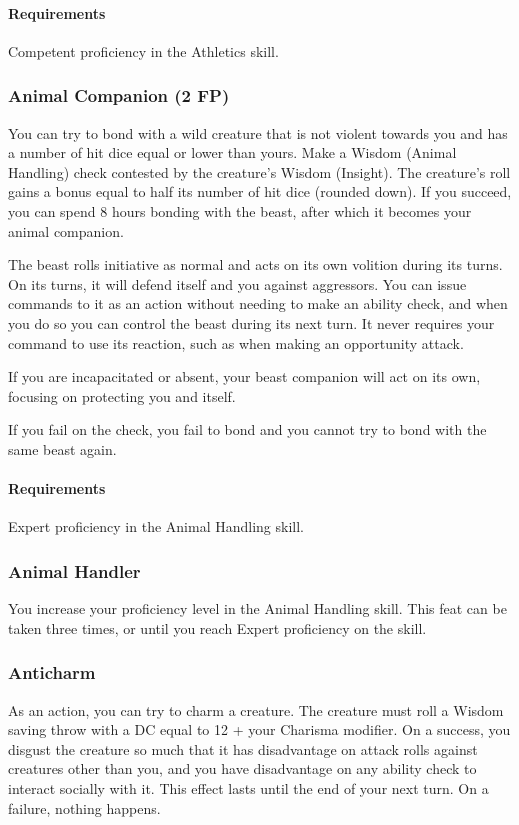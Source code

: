     \paragraph{Requirements} Competent proficiency in the Athletics skill.
\subsubsection{Animal Companion (2 FP)} \label{feat::animalcompanion}
    You can try to bond with a wild creature that is not violent towards you and has a number of hit dice equal or lower than yours.
    Make a Wisdom (Animal Handling) check contested by the creature's Wisdom (Insight).
    The creature's roll gains a bonus equal to half its number of hit dice (rounded down).
    If you succeed, you can spend 8 hours bonding with the beast, after which it becomes your animal companion.

    The beast rolls initiative as normal and acts on its own volition during its turns.
    On its turns, it will defend itself and you against aggressors.
    You can issue commands to it as an action without needing to make an ability check, and when you do so you can control the beast during its next turn.
    It never requires your command to use its reaction, such as when making an opportunity attack.

    If you are incapacitated or absent, your beast companion will act on its own, focusing on protecting you and itself.

    If you fail on the check, you fail to bond and you cannot try to bond with the same beast again.
    \paragraph{Requirements} Expert proficiency in the Animal Handling skill.
\subsubsection{Animal Handler} \label{feat::animalhandler}
    You increase your proficiency level in the Animal Handling skill.
    This feat can be taken three times, or until you reach Expert proficiency on the skill.
\subsubsection{Anticharm} \label{feat::anticharm}
    As an action, you can try to charm a creature.
    The creature must roll a Wisdom saving throw with a DC equal to 12 + your Charisma modifier.
    On a success, you disgust the creature so much that it has disadvantage on attack rolls against creatures other than you, and you have disadvantage on any ability check to interact socially with it.
    This effect lasts until the end of your next turn.
    On a failure, nothing happens.

